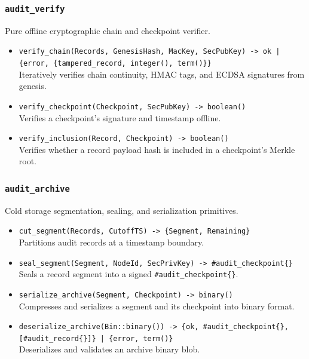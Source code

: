 \documentclass{article}
\begin{document}
\subsubsection{\texttt{audit\_verify}}
Pure offline cryptographic chain and checkpoint verifier.
\begin{itemize}
    \item \texttt{verify\_chain(Records, GenesisHash, MacKey, SecPubKey) -> ok | \{error, \{tampered\_record, integer(), term()\}\}} \\
    Iteratively verifies chain continuity, HMAC tags, and ECDSA signatures from genesis.
    \item \texttt{verify\_checkpoint(Checkpoint, SecPubKey) -> boolean()} \\
    Verifies a checkpoint's signature and timestamp offline.
    \item \texttt{verify\_inclusion(Record, Checkpoint) -> boolean()} \\
    Verifies whether a record payload hash is included in a checkpoint's Merkle root.
\end{itemize}

\subsubsection{\texttt{audit\_archive}}
Cold storage segmentation, sealing, and serialization primitives.
\begin{itemize}
    \item \texttt{cut\_segment(Records, CutoffTS) -> \{Segment, Remaining\}} \\
    Partitions audit records at a timestamp boundary.
    \item \texttt{seal\_segment(Segment, NodeId, SecPrivKey) -> \#audit\_checkpoint\{\}} \\
    Seals a record segment into a signed \texttt{\#audit\_checkpoint\{\}}.
    \item \texttt{serialize\_archive(Segment, Checkpoint) -> binary()} \\
    Compresses and serializes a segment and its checkpoint into binary format.
    \item \texttt{deserialize\_archive(Bin::binary()) -> \{ok, \#audit\_checkpoint\{\}, [\#audit\_record\{\}]\} | \{error, term()\}} \\
    Deserializes and validates an archive binary blob.
\end{itemize}
\end{document}
